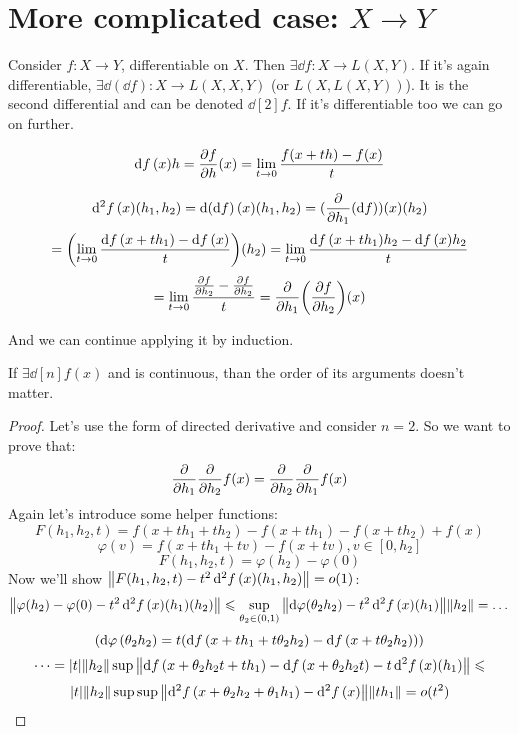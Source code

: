 \section*{More complicated case: $X \to Y$}
Consider $f: X \to Y$, differentiable on $X$. Then $\exists \dd{f}: X \to L(X, Y)$.
If it's again differentiable, $\exists \dd(\dd{f}): X \to L(X, X, Y)$ (or $L(X, L(X, Y))$). 
It is the second differential and can be denoted $\dd[2]{f}$. If it's differentiable too we can go on further.

\begin{thr}
    \[\dd{f}(x)h = \pdv{f}{h}\/(x) = \lim\limits_{t \to 0} \frac{f(x + th) - f(x)}{t}\]
\end{thr}

\begin{thr}
    \[\dd[2]{f}(x)(h_1, h_2) = \dd(\dd{f})(x)(h_1, h_2) = (\pdv{h_1}(\dd{f}))(x)(h_2) \]
    \[ = \qty(\lim\limits_{t \to 0} \frac{\dd{f}(x + th_1) - \dd{f}(x)}{t})(h_2) = \lim\limits_{t \to 0} \frac{\dd{f}(x + th_1)h_2 - \dd{f}(x)h_2}{t} \]
    \[ = \lim\limits_{t \to 0} \frac{\pdv{f}{h_2}(x+th_1) - \pdv{f}{h_2}(x)}{t} = \pdv{h_1}\qty(\pdv{f}{h_2})(x) \]
\end{thr}
And we can continue applying it by induction.

\begin{thr}
    If $\exists \dd[n]{f}(x)$ and is continuous, than the order of its arguments doesn't matter.
\end{thr}
\begin{proof}
    Let's use the form of directed derivative and consider $n = 2$. So we want to prove that:
    \[ \pdv{h_1} \pdv{h_2} f(x) = \pdv{h_2} \pdv{h_1} f(x) \]
    Again let's introduce some helper functions:
    \[ F(h_1, h_2, t) = f(x + th_1 + th_2) - f(x + th_1) - f(x + th_2) + f(x) \] 
    \[ \varphi(v) = f(x + th_1 + tv) - f(x + tv), v \in [0, h_2] \] 
    \[ F(h_1, h_2, t) = \varphi(h_2) - \varphi(0) \]
    Now we'll show $\norm{F(h_1, h_2, t) - t^2 \dd[2]{f}(x)(h_1, h_2)} = o(1)$:
    \[ \norm{\varphi(h_2) - \varphi(0) - t^2 \dd[2]{f}(x)(h_1)(h_2)} \leqslant
      \sup\limits_{\theta_2 \in (0, 1)} \norm{\dd{\varphi(\theta_2 h_2) - t^2\dd[2]{f}(x)(h_1)} } \norm{h_2} = \dots \]
    \[ \qty( \dd{\varphi}(\theta_2 h_2) = t(\dd{f}(x + th_1 + t \theta_2 h_2) - \dd{f}(x + t \theta_2 h_2)) ) \] 
    \[ \dots = \abs{t}\norm{h_2} \sup \norm{\dd{f}(x + \theta_2 h_2 t + th_1) - \dd{f}(x + \theta_2 h_2 t) - t \dd[2]{f}(x)(h_1)} \leqslant \]
    \[ \abs{t}\norm{h_2} \sup \sup \norm{ \dd[2]{f}(x + \theta_2 h_2 + \theta_1 h_1) - \dd[2]{f}(x)}\norm{th_1} = o(t^2) \]

\end{proof}

